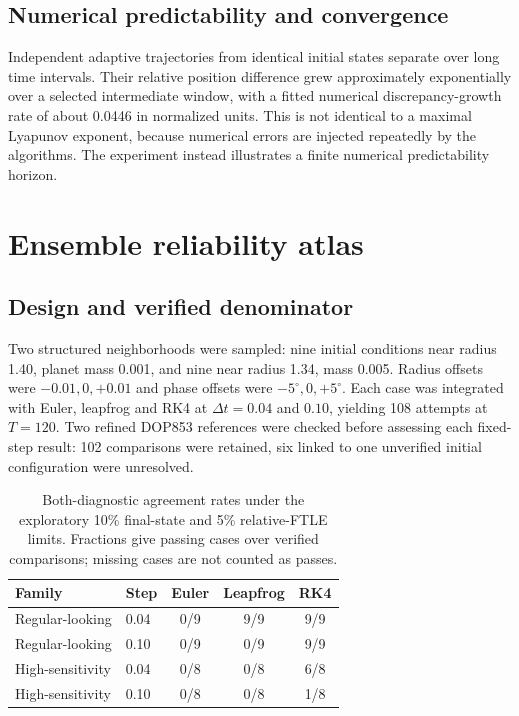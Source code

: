 \documentclass[10pt,letterpaper,twocolumn]{article}
\begin{document}
\subsection{Numerical predictability and convergence}
Independent adaptive trajectories from identical initial states separate over long time intervals. Their relative position difference grew approximately exponentially over a selected intermediate window, with a fitted numerical discrepancy-growth rate of about 0.0446 in normalized units. This is not identical to a maximal Lyapunov exponent, because numerical errors are injected repeatedly by the algorithms. The experiment instead illustrates a finite numerical predictability horizon.

\section{Ensemble reliability atlas}
\subsection{Design and verified denominator}
Two structured neighborhoods were sampled: nine initial conditions near radius 1.40, planet mass 0.001, and nine near radius 1.34, mass 0.005. Radius offsets were $-0.01,0,+0.01$ and phase offsets were $-5^\circ,0,+5^\circ$. Each case was integrated with Euler, leapfrog and RK4 at $\Delta t=0.04$ and $0.10$, yielding 108 attempts at $T=120$. Two refined DOP853 references were checked before assessing each fixed-step result: 102 comparisons were retained, six linked to one unverified initial configuration were unresolved.

\begin{table}[H]\centering\caption{Both-diagnostic agreement rates under the exploratory 10\% final-state and 5\% relative-FTLE limits. Fractions give passing cases over verified comparisons; missing cases are not counted as passes.}\label{tab:atlas}\small\begin{tabular}{llccc}\toprule Family & Step & Euler & Leapfrog & RK4\\\midrule Regular-looking & 0.04 & 0/9 & 9/9 & 9/9\\ Regular-looking & 0.10 & 0/9 & 0/9 & 9/9\\ High-sensitivity & 0.04 & 0/8 & 0/8 & 6/8\\ High-sensitivity & 0.10 & 0/8 & 0/8 & 1/8\\\bottomrule\end{tabular}\end{table}
\end{document}
